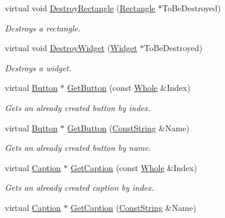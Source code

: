 \begin{DoxyCompactItemize}
virtual void \hyperlink{classphys_1_1UI_1_1Layer_a8bfa08dad890a56e056054b09162cdf4}{DestroyRectangle} (\hyperlink{classphys_1_1UI_1_1Rectangle}{Rectangle} $\ast$ToBeDestroyed)
\begin{DoxyCompactList}\small\item\em Destroys a rectangle. \item\end{DoxyCompactList}\item 
virtual void \hyperlink{classphys_1_1UI_1_1Layer_a472de1771d8e80232292ec6a19c871a6}{DestroyWidget} (\hyperlink{classphys_1_1UI_1_1Widget}{Widget} $\ast$ToBeDestroyed)
\begin{DoxyCompactList}\small\item\em Destroys a widget. \item\end{DoxyCompactList}\item 
virtual \hyperlink{classphys_1_1UI_1_1Button}{Button} $\ast$ \hyperlink{classphys_1_1UI_1_1Layer_a96d3a5d016d435878c0184d02c839089}{GetButton} (const \hyperlink{namespacephys_a460f6bc24c8dd347b05e0366ae34f34a}{Whole} \&Index)
\begin{DoxyCompactList}\small\item\em Gets an already created button by index. \item\end{DoxyCompactList}\item 
virtual \hyperlink{classphys_1_1UI_1_1Button}{Button} $\ast$ \hyperlink{classphys_1_1UI_1_1Layer_a6331e3e7a049deba36aba957d0dcecd8}{GetButton} (\hyperlink{namespacephys_a5ce5049f8b4bf88d6413c47b504ebb31}{ConstString} \&Name)
\begin{DoxyCompactList}\small\item\em Gets an already created button by name. \item\end{DoxyCompactList}\item 
virtual \hyperlink{classphys_1_1UI_1_1Caption}{Caption} $\ast$ \hyperlink{classphys_1_1UI_1_1Layer_a78334cb4e75aaa559bfb76af31e2d0e0}{GetCaption} (const \hyperlink{namespacephys_a460f6bc24c8dd347b05e0366ae34f34a}{Whole} \&Index)
\begin{DoxyCompactList}\small\item\em Gets an already created caption by index. \item\end{DoxyCompactList}\item 
virtual \hyperlink{classphys_1_1UI_1_1Caption}{Caption} $\ast$ \hyperlink{classphys_1_1UI_1_1Layer_af2dd8dc0a5b8775f069b98ce36ce9af6}{GetCaption} (\hyperlink{namespacephys_a5ce5049f8b4bf88d6413c47b504ebb31}{ConstString} \&Name)

\end{DoxyCompactItemize}
